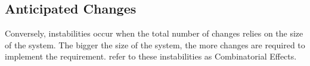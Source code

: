 \subsection{Anticipated Changes} \label{subsec_anticipated_changes}

Conversely, instabilities occur when the total number of changes relies
on the size of the system. The bigger the size of the system, the more changes are
required to implement the requirement.\textcite[271]{mannaert_normalized_2016} refer to
these instabilities as Combinatorial Effects.
